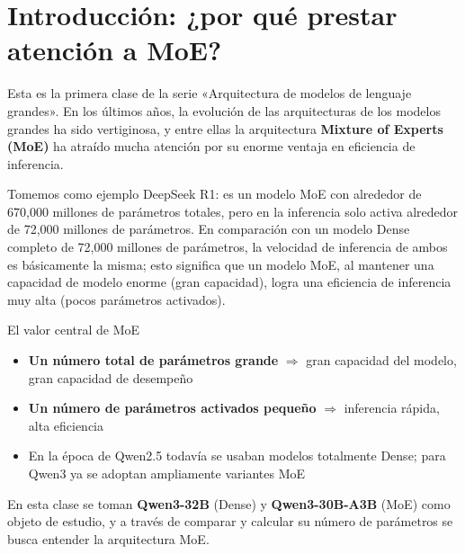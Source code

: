 \section{Introducción: ¿por qué prestar atención a MoE?}

Esta es la primera clase de la serie «Arquitectura de modelos de lenguaje grandes». En los últimos años, la evolución de las arquitecturas de los modelos grandes ha sido vertiginosa, y entre ellas la arquitectura \textbf{Mixture of Experts (MoE)} ha atraído mucha atención por su enorme ventaja en eficiencia de inferencia.

Tomemos como ejemplo DeepSeek R1: es un modelo MoE con alrededor de 670,000 millones de parámetros totales, pero en la inferencia solo activa alrededor de 72,000 millones de parámetros. En comparación con un modelo Dense completo de 72,000 millones de parámetros, la velocidad de inferencia de ambos es básicamente la misma; esto significa que un modelo MoE, al mantener una capacidad de modelo enorme (gran capacidad), logra una eficiencia de inferencia muy alta (pocos parámetros activados).

\begin{importantbox}{El valor central de MoE}
\begin{itemize}
  \item \textbf{Un número total de parámetros grande} $\Rightarrow$ gran capacidad del modelo, gran capacidad de desempeño
  \item \textbf{Un número de parámetros activados pequeño} $\Rightarrow$ inferencia rápida, alta eficiencia
  \item En la época de Qwen2.5 todavía se usaban modelos totalmente Dense; para Qwen3 ya se adoptan ampliamente variantes MoE
\end{itemize}
\end{importantbox}

En esta clase se toman \textbf{Qwen3-32B} (Dense) y \textbf{Qwen3-30B-A3B} (MoE) como objeto de estudio, y a través de comparar y calcular su número de parámetros se busca entender la arquitectura MoE.
